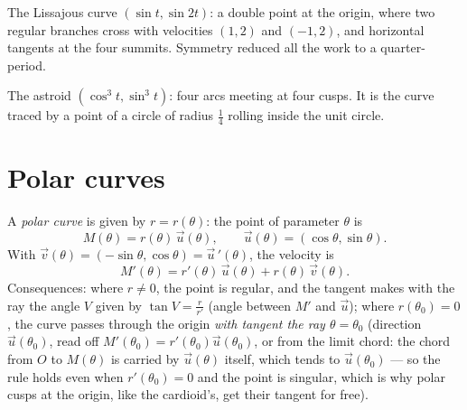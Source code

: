 \begin{omfigure}

{\small The Lissajous curve $(\sin t, \sin 2t)$: a double point
at the origin, where two regular branches cross with velocities
$(1, 2)$ and $(-1, 2)$, and horizontal tangents at the four
summits. Symmetry reduced all the work to a quarter-period.}
\end{omfigure}

\begin{omfigure}

{\small The astroid $(\cos^3 t, \sin^3 t)$: four arcs meeting at
four cusps. It is the curve traced by a point of a circle of radius
$\frac14$ rolling inside the unit circle.}
\end{omfigure}

\section{Polar curves}

\begin{definition}\label{def:b1:curves:polar}
A \emph{polar curve} is given by $r = r(\theta)$:
the point of parameter $\theta$ is
\[
M(\theta) = r(\theta)\,\vec u(\theta),
\qquad \vec u(\theta) = (\cos\theta, \sin\theta).
\]
With $\vec v(\theta) = (-\sin\theta, \cos\theta) = \vec
u\,'(\theta)$, the velocity is
\[
M'(\theta) = r'(\theta)\, \vec u(\theta) + r(\theta)\, \vec
v(\theta) .
\]
Consequences: where $r \neq 0$, the point is regular, and the
tangent makes with the ray the angle $V$ given by $\tan V =
\frac{r}{r'}$ (angle between $M'$ and $\vec u$); where $r(\theta_0)
= 0$, the curve passes through the origin \emph{with tangent the ray
$\theta = \theta_0$} (direction $\vec u(\theta_0)$, read off
$M'(\theta_0) = r'(\theta_0)\vec u(\theta_0)$, or from the limit
chord: the chord from $O$ to $M(\theta)$ is carried by $\vec
u(\theta)$ itself, which tends to $\vec u(\theta_0)$ --- so the
rule holds even when $r'(\theta_0) = 0$ and the point is
singular, which is why polar cusps at the origin, like the
cardioid's, get their tangent for free).
\end{definition}

